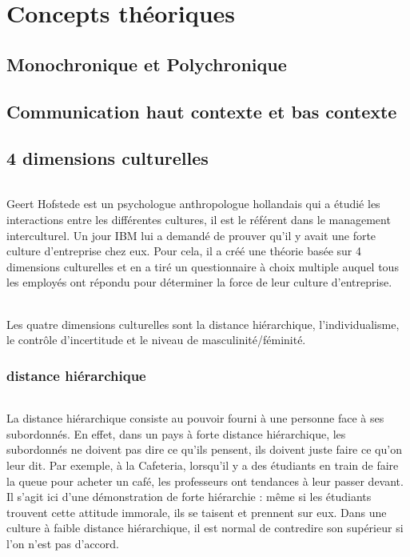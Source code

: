 \part{Concepts théoriques}
\chapter{Monochronique et Polychronique}

\chapter{Communication haut contexte et bas contexte}

\chapter{4 dimensions culturelles}
\paragraph{}
Geert Hofstede est un psychologue anthropologue hollandais qui a étudié les interactions entre les différentes cultures, il est le référent dans le management interculturel. Un jour IBM lui a demandé de prouver qu’il y avait une forte culture d’entreprise chez eux. Pour cela, il a créé une théorie basée sur 4 dimensions culturelles et en a tiré un questionnaire à choix multiple auquel tous les employés ont répondu pour déterminer la force de leur culture d’entreprise.
\paragraph{}
Les quatre dimensions culturelles sont la distance hiérarchique, l’individualisme, le contrôle d’incertitude et le niveau de masculinité/féminité.

\section{distance hiérarchique}
\paragraph{}
La distance hiérarchique consiste au pouvoir fourni à une personne face à ses subordonnés. En effet, dans un pays à forte distance hiérarchique, les subordonnés ne doivent pas dire ce qu’ils pensent, ils doivent juste faire ce qu’on leur dit. Par exemple, à la Cafeteria, lorsqu’il y a des étudiants en train de faire la queue pour acheter un café, les professeurs ont tendances à leur passer devant. Il s’agit ici d’une démonstration de forte hiérarchie : même si les étudiants trouvent cette attitude immorale, ils se taisent et prennent sur eux. Dans une culture à faible distance hiérarchique, il est normal de contredire son supérieur si l’on n’est pas d’accord. 

